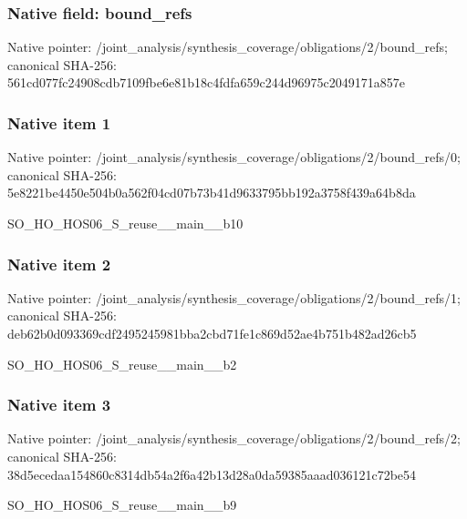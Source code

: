\documentclass[10pt,a4paper]{article}
\begin{document}
\subsubsection{Native field: bound\_\allowbreak{}refs}
Native pointer: /joint\_\allowbreak{}analysis/synthesis\_\allowbreak{}coverage/obligations/2/bound\_\allowbreak{}refs; canonical SHA-256: 561cd077fc24908cdb7109fbe6e81b18c4fdfa659c244d96975c2049171a857e

\subsubsection{Native item 1}
Native pointer: /joint\_\allowbreak{}analysis/synthesis\_\allowbreak{}coverage/obligations/2/bound\_\allowbreak{}refs/0; canonical SHA-256: 5e8221be4450e504b0a562f04cd07b73b41d9633795bb192a3758f439a64b8da

\begingroup\raggedright\sloppy SO\_\allowbreak{}HO\_\allowbreak{}HOS06\_\allowbreak{}S\_\allowbreak{}reuse\_\allowbreak{}\_\allowbreak{}main\_\allowbreak{}\_\allowbreak{}b10\par\endgroup

\subsubsection{Native item 2}
Native pointer: /joint\_\allowbreak{}analysis/synthesis\_\allowbreak{}coverage/obligations/2/bound\_\allowbreak{}refs/1; canonical SHA-256: deb62b0d093369cdf2495245981bba2cbd71fe1c869d52ae4b751b482ad26cb5

\begingroup\raggedright\sloppy SO\_\allowbreak{}HO\_\allowbreak{}HOS06\_\allowbreak{}S\_\allowbreak{}reuse\_\allowbreak{}\_\allowbreak{}main\_\allowbreak{}\_\allowbreak{}b2\par\endgroup

\subsubsection{Native item 3}
Native pointer: /joint\_\allowbreak{}analysis/synthesis\_\allowbreak{}coverage/obligations/2/bound\_\allowbreak{}refs/2; canonical SHA-256: 38d5ecedaa154860c8314db54a2f6a42b13d28a0da59385aaad036121c72be54

\begingroup\raggedright\sloppy SO\_\allowbreak{}HO\_\allowbreak{}HOS06\_\allowbreak{}S\_\allowbreak{}reuse\_\allowbreak{}\_\allowbreak{}main\_\allowbreak{}\_\allowbreak{}b9\par\endgroup
\end{document}
